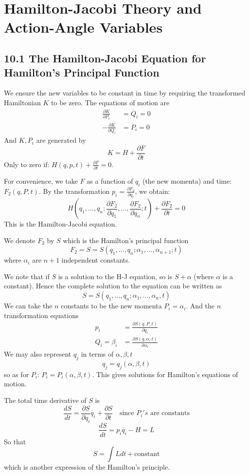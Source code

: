 \documentclass{article}
\begin{document}
	
	\section*{Hamilton-Jacobi Theory and Action-Angle Variables}
	
	\subsection{10.1 The Hamilton-Jacobi Equation for Hamilton's Principal Function}
	We ensure the new variables to be constant in time by requiring the transformed Hamiltonian $K$ to be zero. The equations of motion are
	\begin{align*}
		\frac{\partial K}{\partial P_i} &= \dot{Q_i} = 0 \\
		-\frac{\partial K}{\partial Q_i} &= \dot{P_i} = 0
	\end{align*}
	And $K, P_i$ are generated by
	\[ K = H + \frac{\partial F}{\partial t} \]
	Only to zero if: $H(q, p, t) + \frac{\partial F}{\partial t} = 0$.
	
	For convenience, we take $F$ as a function of $q_i$ (the new momenta) and time: $F_2(q, P, t)$. By the transformation $p_i = \frac{\partial F_2}{\partial q_i}$, we obtain:
	\[ H\left(q_1, \dots, q_n; \frac{\partial F_2}{\partial q_1}, \dots, \frac{\partial F_2}{\partial q_n}; t\right) + \frac{\partial F_2}{\partial t} = 0 \]
	This is the Hamilton-Jacobi equation.
	
	We denote $F_2$ by $S$ which is the Hamilton's principal function
	\[ F_2 = S = S(q_1, \dots, q_n; \alpha_1, \dots, \alpha_{n+1}; t) \]
	where $\alpha_i$ are $n+1$ independent constants.
	
	We note that if $S$ is a solution to the H-J equation, so is $S+\alpha$ (where $\alpha$ is a constant). Hence the complete solution to the equation can be written as
	\[ S = S(q_1, \dots, q_n; \alpha_1, \dots, \alpha_n, t) \]
	We can take the $n$ constants to be the new momenta $P_i = \alpha_i$.
	And the $n$ transformation equations
	\begin{align*}
		p_i &= \frac{\partial S(q, P, t)}{\partial q_i} \\
		Q_i = \beta_i &= \frac{\partial S(q, \alpha, t)}{\partial \alpha_i}
	\end{align*}
	We may also represent $q_j$ in terms of $\alpha, \beta, t$
	\[ q_j = q_j(\alpha, \beta, t) \]
	so as for $P_i$: $P_i = P_i(\alpha, \beta, t)$.
	This gives solutions for Hamilton's equations of motion.
	
	The total time derivative of $S$ is
	\[ \frac{dS}{dt} = \frac{\partial S}{\partial q_i}\dot{q_i} + \frac{\partial S}{\partial t} \quad \text{since } P_i's \text{ are constants} \]
	\[ \frac{dS}{dt} = p_i \dot{q_i} - H = L \]
	So that
	\[ S = \int L dt + \text{constant} \]
	which is another expression of the Hamilton's principle.
	
\end{document}
